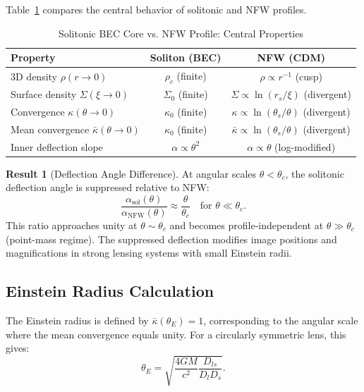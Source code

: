 \documentclass[11pt,a4paper]{article}
\theoremstyle{definition}
\newtheorem{result}{Result}[section]
\theoremstyle{remark}
\begin{document}
Table~\ref{tab:soliton_vs_nfw} compares the central behavior of solitonic and NFW profiles.

\begin{table}[H]
\centering
\caption{Solitonic BEC Core vs. NFW Profile: Central Properties}
\label{tab:soliton_vs_nfw}
\begin{tabular}{@{}lcc@{}}
\toprule
\textbf{Property} & \textbf{Soliton (BEC)} & \textbf{NFW (CDM)} \\
\midrule
3D density $\rho(r \to 0)$ & $\rho_c$ (finite) & $\rho \propto r^{-1}$ (cusp) \\
Surface density $\Sigma(\xi \to 0)$ & $\Sigma_0$ (finite) & $\Sigma \propto \ln(r_s/\xi)$ (divergent) \\
Convergence $\kappa(\theta \to 0)$ & $\kappa_0$ (finite) & $\kappa \propto \ln(\theta_s/\theta)$ (divergent) \\
Mean convergence $\bar{\kappa}(\theta \to 0)$ & $\kappa_0$ (finite) & $\bar{\kappa} \propto \ln(\theta_s/\theta)$ (divergent) \\
Inner deflection slope & $\alpha \propto \theta^2$ & $\alpha \propto \theta$ (log-modified) \\
\bottomrule
\end{tabular}
\end{table}

\begin{result}[Deflection Angle Difference]
\label{res:deflection_difference}
At angular scales $\theta < \theta_c$, the solitonic deflection angle is suppressed relative to NFW:
\begin{equation}
\boxed{\frac{\alpha_{\mathrm{sol}}(\theta)}{\alpha_{\mathrm{NFW}}(\theta)} \approx \frac{\theta}{\theta_c} \quad \text{for } \theta \ll \theta_c.}
\end{equation}
This ratio approaches unity at $\theta \sim \theta_c$ and becomes profile-independent at $\theta \gg \theta_c$ (point-mass regime). The suppressed deflection modifies image positions and magnifications in strong lensing systems with small Einstein radii.
\end{result}

\subsection{Einstein Radius Calculation}
\label{sec:einstein_radius}

The Einstein radius is defined by $\bar{\kappa}(\theta_E) = 1$, corresponding to the angular scale where the mean convergence equals unity. For a circularly symmetric lens, this gives:
\begin{equation}
\theta_E = \sqrt{\frac{4GM}{c^2} \frac{D_{ls}}{D_l D_s}}.
\end{equation}
\end{document}
